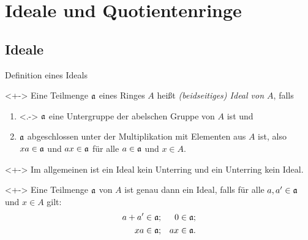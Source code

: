 \section{Ideale und Quotientenringe}

\subsection{Ideale}

\begin{frame}{Definition eines Ideals}
    \begin{definition}<+->
        Eine Teilmenge \(\mathfrak{a}\) eines Ringes \(A\) heißt
        \emph{(beidseitiges) Ideal von \(A\)}, falls
        \begin{enumerate}[<+->]
        \item<.->
            \(\mathfrak{a}\) eine Untergruppe der abelschen Gruppe von \(A\) ist und
        \item
            \(\mathfrak{a}\) abgeschlossen unter der Multiplikation mit
            Elementen aus \(A\) ist, also \(x a \in \mathfrak{a}\) und
            \(a x \in \mathfrak{a}\) für alle \(a \in \mathfrak{a}\) und \(x \in A\).
        \end{enumerate}
    \end{definition}
    \begin{remark}<+->
        Im allgemeinen ist ein Ideal kein Unterring und ein Unterring kein Ideal.
    \end{remark}
    \begin{visibleenv}<+->
        Eine Teilmenge \(\mathfrak{a}\) von \(A\) ist genau dann ein Ideal,
        falls für alle \(a, a' \in \mathfrak{a}\) und \(x \in A\) gilt:
        \begin{align*}
            a + a' & \in \mathfrak{a}; &
            0 & \in \mathfrak{a}; \\
            x a & \in \mathfrak{a}; &
            a x & \in \mathfrak{a}.
        \end{align*}
    \end{visibleenv}
\end{frame}

